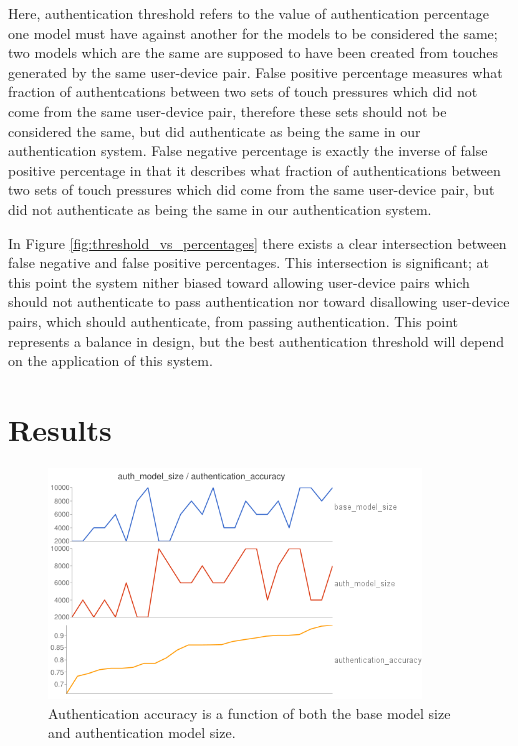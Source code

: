\documentclass{acm_proc_article-sp}
\begin{document}
Here, authentication threshold refers to the value of authentication percentage one model must have against another for the models to be considered the same; two models which are the same are supposed to have been created from touches generated by the same user-device pair.
False positive percentage measures what fraction of authentcations between two sets of touch pressures which did not come from the same user-device pair, therefore these sets should not be considered the same, but did authenticate as being the same in our authentication system.
False negative percentage is exactly the inverse of false positive percentage in that it describes what fraction of authentications between two sets of touch pressures which did come from the same user-device pair, but did not authenticate as being the same in our authentication system.

In Figure \ref{fig:threshold_vs_percentages} there exists a clear intersection between false negative and false positive percentages. This intersection is significant; at this point the system nither biased toward allowing user-device pairs which should not authenticate to pass authentication nor toward disallowing user-device pairs, which should authenticate, from passing authentication. This point represents a balance in design, but the best authentication threshold will depend on the application of this system.

\section{Results}
\label{sec:results}

\begin{figure}
\centering
\includegraphics[width=3.9in]{authentication_accuracy_vs_model_size.png}
\caption{Authentication accuracy is a function of both the base model size and authentication model size.}
\label{fig:authentication_accuracy}
\end{figure}
\end{document}
